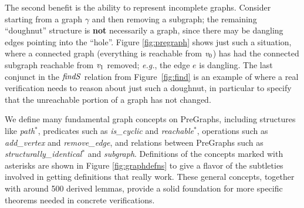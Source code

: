 The second benefit is the ability to represent incomplete graphs.
Consider starting from a graph $\gamma$ and then removing a subgraph; the remaining
``doughnut'' structure is \textbf{not} necessarily a graph, since there may be dangling
edges pointing into the ``hole''.  Figure \ref{fig:pregraph} shows just such a situation,
where a connected graph (everything is reachable from $\mathit{v}_0$) has had the connected
subgraph reachable from $\mathit{v}_1$ removed; \emph{e.g.}, the edge $e$ is dangling.
The last conjunct in the $\mathit{findS}$ relation from Figure~\ref{fig:find} is an example
of where a real verification needs to reason about just such a doughnut, in particular
to specify that the unreachable portion of a graph has not changed.


We define many fundamental graph concepts on PreGraphs,
including structures like \emph{path}$^{*}$, predicates
such as \emph{is\_cyclic} and \emph{reachable}$^{*}$,
operations such as \emph{add\_vertex}
and \emph{remove\_edge}, and relations between PreGraphs such
as \emph{structurally\_identical}$^{*}$ and \emph{subgraph}.
Definitions of the concepts marked with asterisks are
shown in Figure \ref{fig:graphdefns} to give a flavor
of the subtleties involved in getting definitions that
really work.
These general concepts, together with around 500 derived lemmas,
provide a
solid foundation for more specific theorems needed in concrete
verifications.

